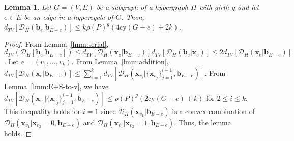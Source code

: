 \documentclass[letterpaper,11pt]{article}
\newtheorem{lemma}[theorem]{Lemma}
\newcommand{\dtv}{d_{TV}}
\newcommand{\cald}{\mathcal{D}}
\newcommand{\bfx}{\mathbf{x}}
\newcommand{\bfb}{\mathbf{b}}
\begin{document}
\begin{lemma}\label{lmm:E-to-e}
  Let $G=(V,E)$ be a subgraph of a hypergraph $H$ with girth $g$ and let $e\in E$ be an edge in a hypercycle of $G$.
  Then, \(\dtv[\cald_H(\bfb_e|\bfb_{E-e})]\leq k \rho(P)^g(4\mathrm{cy}(G-e)+2k) \).
\end{lemma}
\begin{proof}
  From Lemma~\ref{lmm:serial},
  \(\dtv(\cald_H[\bfb_e|\bfb_{E-e}]) \leq \dtv[\cald_H(\bfx_e|\bfb_{E-e})]\dtv[\cald_H(\bfb_e|\bfx_e)] \leq 2\dtv[\cald_H(\bfx_e|\bfb_{E-e})]\).
  Let $e=(v_1,\ldots,v_k)$.
  From Lemma~\ref{lmm:addition}, 
  \(\dtv[\cald_H(\bfx_e|\bfb_{E-e})] \leq \sum_{i=1}^k\dtv[\cald_H(\bfx_{v_i}|\{\bfx_{v_{j}}\}_{j=1}^{i-1},\bfb_{E-e})] \).
  From Lemma~\ref{lmm:E+S-to-v}, 
  we have \( \dtv[\cald_H(\bfx_{v_i}|\{\bfx_{v_{j}}\}_{j=1}^{i-1},\bfb_{E-e})]\leq \rho(P)^g(2\mathrm{cy}(G-e)+k) \) for $2\leq i\leq k$.
  This inequality holds for $i=1$ since $\cald_H(\bfx_{v_1}|\bfb_{E-e})$ is a convex combination of $\cald_H(\bfx_{v_1}|\bfx_{v_2}=0,\bfb_{E-e})$ and $\cald_H(\bfx_{v_1}|\bfx_{v_2}=1,\bfb_{E-e})$.
  Thus, the lemma holds.
\end{proof}
\end{document}
